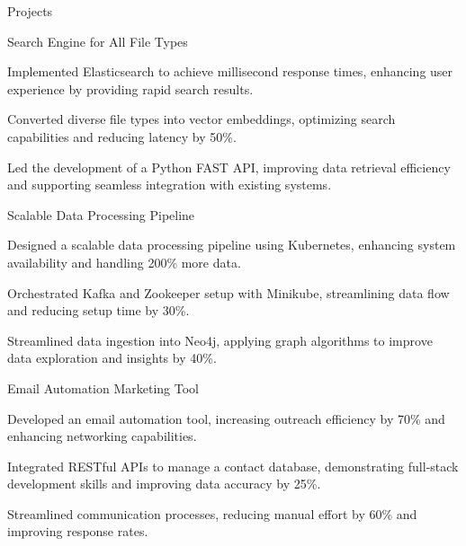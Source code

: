 \documentclass{resume} %
\begin{document}
    \begin{rSection}{Projects}
                    \begin{rSubsection}
                                    {Search Engine for All File Types}
                                {\normalfont{ - }}{}{}
                                    \item Implemented Elasticsearch to achieve millisecond response times, enhancing user experience by providing rapid search results.
                                    \item Converted diverse file types into vector embeddings, optimizing search capabilities and reducing latency by 50\%.
                                    \item Led the development of a Python FAST API, improving data retrieval efficiency and supporting seamless integration with existing systems.
                            \end{rSubsection}
                    \begin{rSubsection}
                                    {Scalable Data Processing Pipeline}
                                {\normalfont{ - }}{}{}
                                    \item Designed a scalable data processing pipeline using Kubernetes, enhancing system availability and handling 200\% more data.
                                    \item Orchestrated Kafka and Zookeeper setup with Minikube, streamlining data flow and reducing setup time by 30\%.
                                    \item Streamlined data ingestion into Neo4j, applying graph algorithms to improve data exploration and insights by 40\%.
                            \end{rSubsection}
                    \begin{rSubsection}
                                    {Email Automation Marketing Tool}
                                {\normalfont{ - }}{}{}
                                    \item Developed an email automation tool, increasing outreach efficiency by 70\% and enhancing networking capabilities.
                                    \item Integrated RESTful APIs to manage a contact database, demonstrating full{-}stack development skills and improving data accuracy by 25\%.
                                    \item Streamlined communication processes, reducing manual effort by 60\% and improving response rates.
                            \end{rSubsection}
            \end{rSection}
\end{document}

